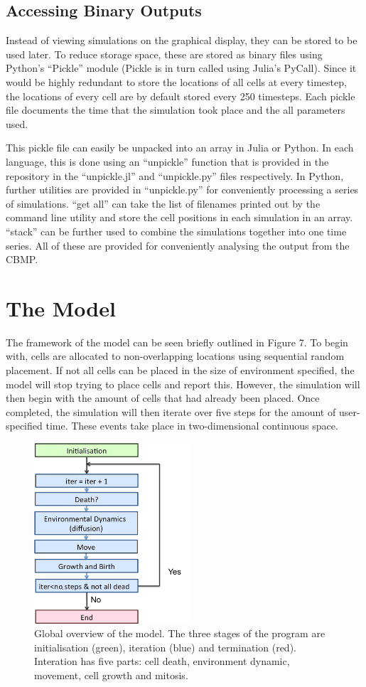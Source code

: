 \documentclass[12pt]{article}
\begin{document}
\subsection{Accessing Binary Outputs}
Instead of viewing simulations on the graphical display, they can be 
stored to be used later. To reduce storage space, these are stored as 
binary files using Python's ``Pickle'' module (Pickle is in turn called 
using Julia's PyCall). Since it would be highly redundant to store the 
locations of all cells at every timestep, the locations of every cell 
are by default stored every 250 timesteps. Each pickle file documents 
the time that the simulation took place and the all parameters used.

This pickle file can easily be unpacked into an array in Julia or 
Python. In each language, this is done using an ``unpickle'' function 
that is provided in the repository in the ``unpickle.jl'' and 
``unpickle.py'' files respectively. In Python, further utilities are 
provided in ``unpickle.py'' for conveniently processing a series of 
simulations. ``get all'' can take the list of filenames printed out by 
the command line utility and store the cell positions in each simulation 
in an array. ``stack'' can be further used to combine the simulations 
together into one time series. All of these are provided for 
conveniently analysing the output from the CBMP.

\section{The Model}
The framework of the model can be seen briefly outlined in Figure 7. To 
begin with, cells are allocated to non-overlapping locations using 
sequential random placement. If not all cells can be placed in the size 
of environment specified, the model will stop trying to place cells and 
report this. However, the simulation will then begin with the amount of 
cells that had already been placed. Once completed, the simulation will 
then iterate over five steps for the amount of user-specified time. 
These events take place in two-dimensional continuous space. 

\begin{figure}[H]
\centering
\includegraphics[width=5.81cm]{media/algorithmoverview.png}
\caption[]{Global overview of the model. The three stages of the program
  are initialisation (green), iteration (blue) and termination (red). 
  Interation has five parts: cell death, environment dynamic, movement, cell 
growth and mitosis.}
\end{figure}
\end{document}
